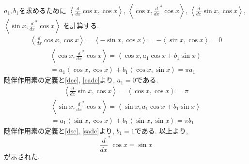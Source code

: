\documentclass[a4paper,11pt]{jsarticle}
\begin{document}
$a_1, b_1$を求めるために 
$\left<\frac{d}{dx}\cos{x}, \cos{x}\right>$,
$\left<\cos{x}, \frac{d}{dx}^*\cos{x}\right>$,
$\left<\frac{d}{dx}\sin{x}, \cos{x}\right>$,
$\left<\sin{x}, \frac{d}{dx}^*\cos{x}\right>$
を計算する.
\begin{eqnarray}
  \left<\frac{d}{dx}\cos{x}, \cos{x}\right>
  = \left<-\sin{x}, \cos{x}\right>
  = -\left<\sin{x}, \cos{x}\right>
  = 0 \label{dcc}
\end{eqnarray}
\begin{equation}
  \begin{split}
    \left<\cos{x}, \frac{d}{dx}^*\cos{x}\right>
    = \left<\cos{x}, a_1\cos{x} + b_1\sin{x}\right> \\
    = a_1\left<\cos{x}, \cos{x}\right> + b_1\left<\cos{x}, \sin{x}\right>
    = \pi a_1
  \end{split}
  \label{cadc}
\end{equation}
随伴作用素の定義と\eqref{dcc}, \eqref{cadc}より, $a_1=0$である.
\begin{eqnarray}
  \left<\frac{d}{dx}\sin{x}, \cos{x}\right>
  = \left<\cos{x}, \cos{x}\right>
  = \pi \label{dsc}
\end{eqnarray}
\begin{equation}
  \begin{split}
    \left<\sin{x}, \frac{d}{dx}^*\cos{x}\right>
    = \left<\sin{x}, a_1\cos{x} + b_1\sin{x}\right> \\
    = a_1\left<\sin{x}, \cos{x}\right> + b_1\left<\sin{x}, \sin{x}\right>
    = \pi b_1
  \end{split}
  \label{sadc}
\end{equation}
随伴作用素の定義と\eqref{dsc}, \eqref{sadc}より, $b_1=1$である.
以上より, 
\[
  \frac{d}{dx}^*\cos{x} = \sin{x}
\]
が示された.
\end{document}
